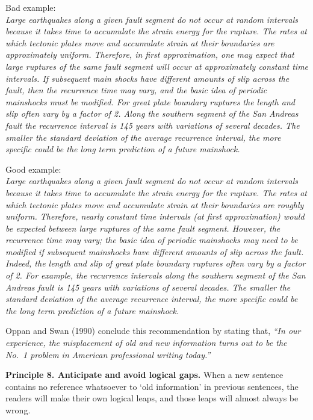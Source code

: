 \documentclass[
]{book}
\begin{document}
Bad example:\\
\emph{Large earthquakes along a given fault segment do not occur at random intervals because it takes time to accumulate the strain energy for the rupture. The rates at which tectonic plates move and accumulate strain at their boundaries are approximately uniform. Therefore, in first approximation, one may expect that large ruptures of the same fault segment will occur at approximately constant time intervals. If subsequent main shocks have different amounts of slip across the fault, then the recurrence time may vary, and the basic idea of periodic mainshocks must be modified. For great plate boundary ruptures the length and slip often vary by a factor of 2. Along the southern segment of the San Andreas fault the recurrence interval is 145 years with variations of several decades. The smaller the standard deviation of the average recurrence interval, the more specific could be the long term prediction of a future mainshock.}

Good example:\\
\emph{Large earthquakes along a given fault segment do not occur at random intervals because it takes time to accumulate the strain energy for the rupture. The rates at which tectonic plates move and accumulate strain at their boundaries are roughly uniform. Therefore, nearly constant time intervals (at first approximation) would be expected between large ruptures of the same fault segment. However, the recurrence time may vary; the basic idea of periodic mainshocks may need to be modified if subsequent mainshocks have different amounts of slip across the fault. Indeed, the length and slip of great plate boundary ruptures often vary by a factor of 2. For example, the recurrence intervals along the southern segment of the San Andreas fault is 145 years with variations of several decades. The smaller the standard deviation of the average recurrence interval, the more specific could be the long term prediction of a future mainshock.}

Oppan and Swan (1990) conclude this recommendation by stating that, \emph{``In our experience, the misplacement of old and new information turns out to be the No.~1 problem in American professional writing today.''}

\textbf{Principle 8. Anticipate and avoid logical gaps.} When a new sentence contains no reference whatsoever to `old information' in previous sentences, the readers will make their own logical leaps, and those leaps will almost always be wrong.
\end{document}

